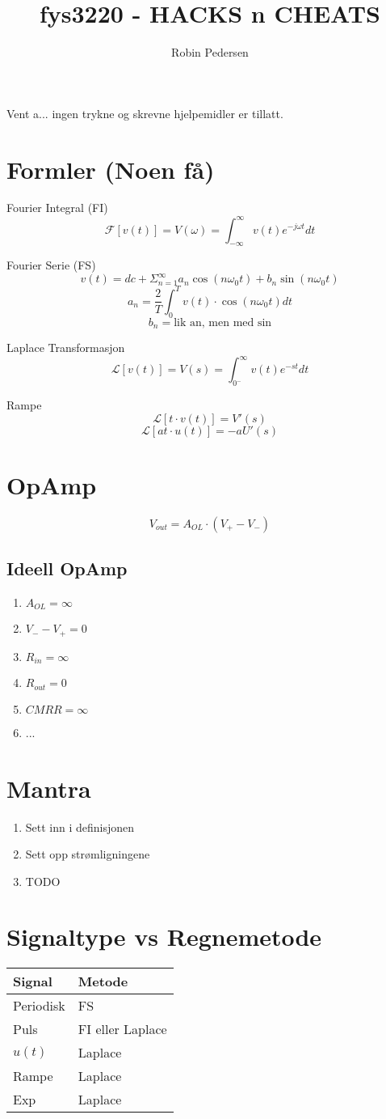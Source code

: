 \documentclass[twocolumn]{article}
\begin{document}
  \title{fys3220 - HACKS n CHEATS}
  \author{Robin Pedersen}
  \maketitle

  Vent a... ingen trykne og skrevne hjelpemidler er tillatt.

  \section{Formler (Noen få)}
    Fourier Integral (FI)
    $$\mathcal{F}[v(t)] = V(\omega)
      = \int_{-\infty}^\infty v(t) e^{-j\omega t} dt
      $$

    Fourier Serie (FS)
    $$v(t) = dc
             + \Sigma_{n=1}^{\infty} a_n \cos(n\omega_0 t)
                                     + b_n \sin(n\omega_0 t)
      $$
    $$a_n = \frac{2}{T} \int_0^T v(t) \cdot \cos(n\omega_0 t) dt$$
    $$b_n = \text{lik an, men med sin}$$

    Laplace Transformasjon
    $$\mathcal{L}[v(t)] = V(s)
      = \int_{0^-}^\infty v(t) e^{-st} dt
      $$

    Rampe
    $$\mathcal{L}[t \cdot v(t)] = V'(s)$$
    $$\mathcal{L}[at \cdot u(t)] = -aU'(s)$$

  \section{OpAmp}
    $$V_{out} = A_{OL} \cdot (V_+ - V_-)$$

    \subsection{Ideell OpAmp}
      \begin{enumerate}
        \item $A_{OL} = \infty$
        \item $V_- - V_+ = 0$
        \item $R_{in} = \infty$
        \item $R_{out} = 0$
        \item $CMRR = \infty$
        \item ...
      \end{enumerate}

  \section{Mantra}
    \begin{enumerate}
      \item Sett inn i definisjonen
      \item Sett opp strømligningene
      \item TODO
    \end{enumerate}

  \section{Signaltype vs Regnemetode}
    \begin{tabular}{|l|l|}
      \hline
      Signal    & Metode \\
      \hline
      Periodisk & FS \\
      Puls      & FI eller Laplace \\
      $u(t)$    & Laplace \\
      Rampe     & Laplace \\
      Exp       & Laplace \\
      \hline
    \end{tabular}
\end{document}
